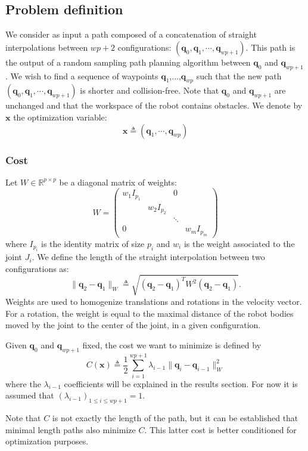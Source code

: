\documentclass{tADR2e}
\newcommand\real{\mathbb{R}}
\newcommand\conf{\mathbf{q}}
\newcommand\xx{\mathbf{x}} %
\newcommand\cost{C}
\begin{document}
\subsection{Problem definition}

We consider as input a path composed of a concatenation of straight 
interpolations between $wp+2$ configurations: $(\conf_0, \conf_1,\cdots,\conf_{wp
+1})$. This path is the output of a random sampling path planning algorithm 
between $\conf_0$ and $\conf_{wp+1}$. We wish to find a sequence of waypoints $
\conf_{1}$,...,$\conf_{wp}$ such that the new path $(\conf_0, \conf_1,\cdots,
\conf_{wp+1})$ is shorter and collision-free. Note that $\conf_0$ and $\conf_{wp
+1}$ are unchanged and that the workspace of the robot contains obstacles. We 
denote by $\xx$ the optimization variable:
$$
\xx \triangleq (\conf_1,\cdots,\conf_{wp})
$$

\subsubsection{Cost}
Let $W\in\real^{p\times p}$ be a diagonal matrix of weights:
$$
W=\left(\begin{array}{cccccccccc}
w_1 I_{p_1}       &        &  0  \\
    & w_2 I_{p_2} &        &   \\
    &            & \ddots &   \\
  0 &            &        & w_m I_{p_m}
\end{array}\right)
$$
where $I_{p_i}$ is the identity matrix of size $p_i$ and $w_i$ is the weight 
associated to the joint $J_i$. We define the length of the straight interpolation 
between two configurations as:
$$
\|\conf_2 - \conf_1\|_{W} \triangleq \sqrt{(\conf_2 - \conf_1)^T W^2 (\conf_2 - 
\conf_1)}.
$$
Weights are used to homogenize translations and rotations in the velocity vector. 
For a rotation, the weight is equal to the maximal distance of the robot bodies 
moved by the joint to the center of the joint, in a given configuration.

Given $\conf_0$ and $\conf_{wp+1}$ fixed, the cost we want to minimize is defined 
by
$$
\cost (\xx) \triangleq \frac{1}{2}\sum_{i=1}^{wp+1} \lambda_{i-1} \|\conf_{i}-\conf_{i-1}\|_{W}
^{2}
$$
where the $\lambda_{i-1}$ coefficients will be explained in the results 
section. For now it is assumed that $(\lambda_{i-1})_{1\leq i\leq wp+1}=1$.

Note that $\cost$ is not exactly the length of the path, but it can be 
established that minimal length paths also minimize $\cost$. This latter cost is 
better conditioned for optimization purposes.
\end{document}
